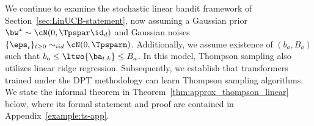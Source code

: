 \documentclass[10pt]{article}
\newcommand{\authnote}[2]{{\scriptsize $\ll$\textsf{#1 notes: #2}$\gg$}}
\newcommand{\authnote}[2]{}
\newcommand{\lc}[1]{{\color{blue}\authnote{Licong}{#1}}}
\begin{document}
We continue to examine the stochastic linear bandit framework of Section~\ref{sec:LinUCB-statement}, now assuming a Gaussian prior $\bw^\star\sim \cN(0,\Tpspar\id_d)$ and Gaussian noises $\{ \eps_t \}_{t \ge 0} \sim_{iid} \cN(0,\Tpsparn)$. Additionally, we assume existence of $(b_a, B_a)$ such that $b_a\leq\ltwo{\ba_{t,k}}\leq B_a$. In this model, Thompson sampling also utilizes linear ridge regression. Subsequently, we establish that transformers trained under the DPT methodology can learn Thompson sampling algorithms. We state the informal theorem in Theorem~\ref{thm:approx_thompson_linear} below, where its formal statement and proof are contained in Appendix~\ref{example:ts-app}. 

\end{document}
